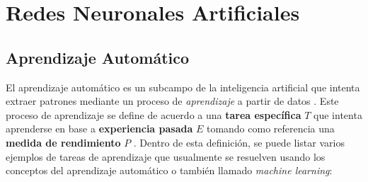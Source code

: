 \section{Redes Neuronales Artificiales}

    \subsection{Aprendizaje Automático}
    El aprendizaje automático es un subcampo de la inteligencia artificial que intenta extraer 
    patrones mediante un proceso de \textit{aprendizaje} a partir de datos \cite{Mitchell1990}. Este proceso 
    de aprendizaje se define de acuerdo a una \textbf{tarea específica} $T$ que intenta aprenderse en base 
    a \textbf{experiencia pasada} $E$ tomando como referencia una \textbf{medida de rendimiento} $P$ . 
    Dentro de esta definición, se puede listar varios ejemplos de tareas de aprendizaje que usualmente se resuelven  
    usando los conceptos del aprendizaje automático o también llamado \textit{machine learning}:
    \\
    \\
